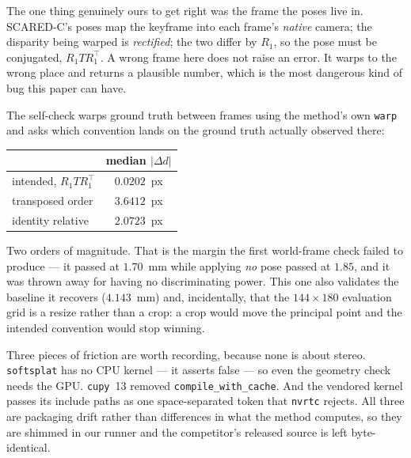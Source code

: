 \documentclass[11pt,a4paper]{article}
\begin{document}
The one thing genuinely ours to get right was the frame the poses live in. SCARED-C's
poses map the keyframe into each frame's \emph{native} camera; the disparity being
warped is \emph{rectified}; the two differ by $R_1$, so the pose must be conjugated,
$R_1 T R_1^{\top}$. A wrong frame here does not raise an error. It warps to the wrong
place and returns a plausible number, which is the most dangerous kind of bug this
paper can have.

The self-check warps ground truth between frames using the method's own \texttt{warp}
and asks which convention lands on the ground truth actually observed there:

\begin{center}
\begin{tabular}{lc}
\toprule
& median $|\Delta d|$ \\
\midrule
intended, $R_1 T R_1^{\top}$ & $\mathbf{0.0202}$~px \\
transposed order & $3.6412$~px \\
identity relative & $2.0723$~px \\
\bottomrule
\end{tabular}
\end{center}

Two orders of magnitude. That is the margin the first world-frame check failed to
produce --- it passed at $1.70$~mm while applying \emph{no} pose passed at $1.85$,
and it was thrown away for having no discriminating power. This one also validates
the baseline it recovers ($4.143$~mm) and, incidentally, that the $144{\times}180$
evaluation grid is a resize rather than a crop: a crop would move the principal point
and the intended convention would stop winning.

Three pieces of friction are worth recording, because none is about stereo.
\texttt{softsplat} has no CPU kernel --- it asserts false --- so even the geometry
check needs the GPU. \texttt{cupy}~13 removed \texttt{compile\_with\_cache}. And the
vendored kernel passes its include paths as one space-separated token that
\texttt{nvrtc} rejects. All three are packaging drift rather than differences in what
the method computes, so they are shimmed in our runner and the competitor's released
source is left byte-identical.
\end{document}
